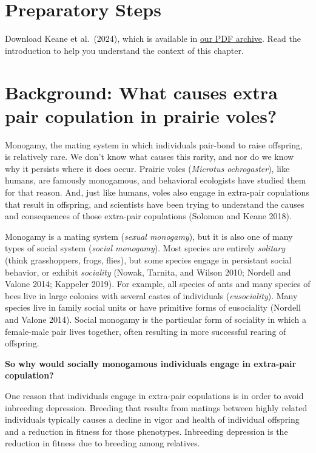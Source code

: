 \documentclass[
  letterpaper,
  DIV=11,
  numbers=noendperiod]{scrreprt}
\begin{document}
\section{Preparatory Steps}\label{preparatory-steps}

Download Keane et al.~(2024), which is available in
\href{https://drive.google.com/drive/folders/1opLlrmF7kfo0FtWwwJ1CbfPWIyuaISC1?usp=share_link}{our
PDF archive}. Read the introduction to help you understand the context
of this chapter.

\section{Background: What causes extra pair copulation in prairie
voles?}\label{background-what-causes-extra-pair-copulation-in-prairie-voles}

Monogamy, the mating system in which individuals pair-bond to raise
offspring, is relatively rare. We don't know what causes this rarity,
and nor do we know why it persists where it does occur. Prairie voles
(\emph{Microtus ochrogaster}), like humans, are famously monogamous, and
behavioral ecologists have studied them for that reason. And, just like
humans, voles also engage in extra-pair copulations that result in
offspring, and scientists have been trying to understand the causes and
consequences of those extra-pair copulations (Solomon and Keane 2018).

Monogamy is a mating system (\emph{sexual monogamy}), but it is also one
of many types of social system (\emph{social monogamy}). Most species
are entirely \emph{solitary} (think grasshoppers, frogs, flies), but
some species engage in persistant social behavior, or exhibit
\emph{sociality} (Nowak, Tarnita, and Wilson 2010; Nordell and Valone
2014; Kappeler 2019). For example, all species of ants and many species
of bees live in large colonies with several castes of individuals
(\emph{eusociality}). Many species live in family social units or have
primitive forms of eusociality (Nordell and Valone 2014). Social
monogamy is the particular form of sociality in which a female-male pair
lives together, often resulting in more successful rearing of offspring.

\textbf{So why would socially monogamous individuals engage in
extra-pair copulation?}

One reason that individuals engage in extra-pair copulations is in order
to avoid inbreeding depression. Breeding that results from matings
between highly related individuals typically causes a decline in vigor
and health of individual offspring and a reduction in fitness for those
phenotypes. Inbreeding depression is the reduction in fitness due to
breeding among relatives.
\end{document}
